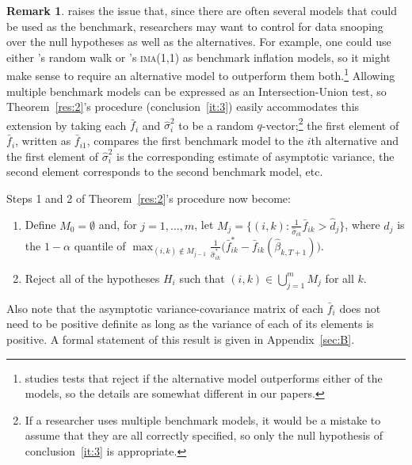 \documentclass[11pt,fleqn]{article}
\newcommand\citepos[2][]{\citeauthor{#2}'s \citeyearpar[#1]{#2}}
\theoremstyle{definition}
\newtheorem{rem}{Remark}
\begin{document}
\begin{rem}\label{rem:01}
  \citet{Pin:11} raises the issue that, since there are often several
  models that could be used as the benchmark, researchers may want to
  control for data snooping over the null hypotheses as well as the
  alternatives.  For example, one could use either \citepos{AtO:01}
  random walk or \citepos{StW:07} \textsc{ima}(1,1) as benchmark
  inflation models, so it might make sense to require an alternative
  model to outperform them both.\footnote{\citet{Pin:11} studies tests
    that reject if the alternative model outperforms either of the
    models, so the details are somewhat different in our papers.}
  Allowing multiple benchmark models can be expressed as an
  Intersection-Union test, so Theorem~\ref{res:2}'s procedure
  (conclusion~\ref{it:3}) easily accommodates this extension by taking
  each $\bar f_i$ and $\hat{\sigma}_{i}^{2}$ to be a random
  $q$-vector;\footnote{If a researcher uses multiple benchmark models,
    it would be a mistake to assume that they are all correctly
    specified, so only the null hypothesis of conclusion~\ref{it:3} is
    appropriate.} the first element of $\bar f_{i}$, written as $\bar
  f_{i1}$, compares the first benchmark model to the $i$th alternative
  and the first element of $\hat{\sigma}_i^2$ is the corresponding
  estimate of asymptotic variance, the second element corresponds to
  the second benchmark model, etc.

  Steps 1 and 2 of Theorem~\ref{res:2}'s procedure now become:
  \begin{enumerate}
  \item Define $M_0 = \emptyset$ and, for $j = 1,\dots,m$, let $M_j =
    \{(i,k): \tfrac1{\hat\sigma_{ik}} \bar{f}_{ik} > \hat{d}_j\}$,
    where $\hat{d}_j$ is the $1 - \alpha$ quantile of $\max_{(i,k)
      \notin M_{j-1}} \tfrac1{\hat\sigma_{ik}^*} \big(\bar{f}_{ik}^{*} -
    \bar{f}_{ik}(\hat{\beta}_{k,T+1})\big)$.
  \item Reject all of the hypotheses $H_i$ such that $(i,k) \in
    \bigcup_{j=1}^m M_j$ for all $k$.
  \end{enumerate}
  Also note that the asymptotic variance-covariance matrix of each
  $\bar f_i$ does not need to be positive definite as long as the
  variance of each of its elements is positive.  A formal statement of
  this result is given in Appendix~\ref{sec:B}.
\end{rem}
\end{document}
